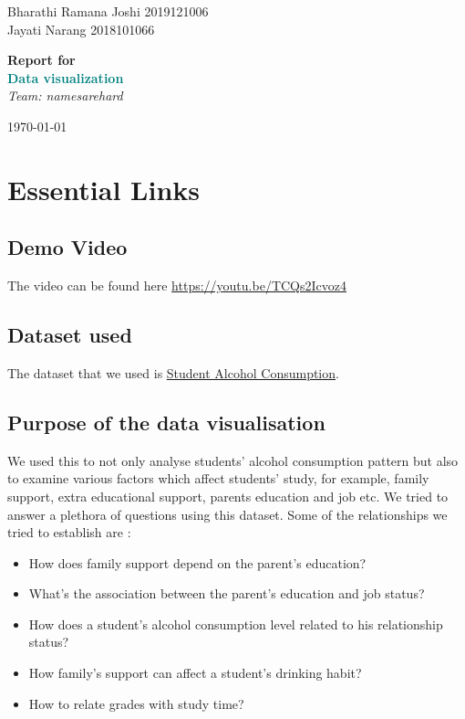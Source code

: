 \documentclass[titlepage, 12pt]{article}
\begin{document}
\begin{titlepage}

	\raggedleft

	\vspace*{\baselineskip}

	{Bharathi Ramana Joshi 2019121006\\Jayati Narang 2018101066}

	\vspace*{0.167\textheight}

	\textbf{\Large Report for}\\[\baselineskip]

	\textbf{\textcolor{teal}{\huge Data visualization}}\\[\baselineskip]

    {\large \textit{Team: namesarehard}}
    \vfill

    \today

	\raggedright

\end{titlepage}

\newpage

\tableofcontents

\newpage

\section{Essential Links}
\subsection{Demo Video}
The video can be found here \url{https://youtu.be/TCQs2Icvoz4}
\subsection{Dataset used} The dataset that we used is \href{https://www.kaggle.com/uciml/student-alcohol-consumption/data}{Student Alcohol Consumption}. 
\subsection{Purpose of the data visualisation}
We used this to not only analyse students' alcohol consumption pattern but also to examine various factors which affect students' study, for example, family support, extra educational support, parents education and job etc. We tried to answer a plethora of questions using this dataset.
Some of the relationships we tried to establish are :
\begin{itemize}
    \item How does family support depend on the parent's education?
    \item What's the association between the parent's education and job status?
    \item How does a student's alcohol consumption level related to his relationship status?
    \item How family's support can affect a student's drinking habit?
    \item How to relate grades with study time?

\end{itemize}
\end{document}

